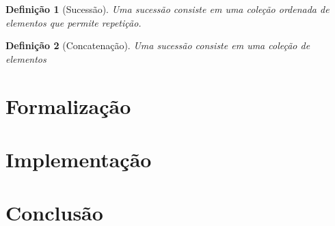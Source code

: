 \documentclass{report}
\newtheorem{definition}{Definição}
\begin{document}

    \begin{definition}[Sucessão]
        Uma sucessão consiste em uma coleção ordenada de elementos que permite repetição.
    \end{definition}

    \begin{definition}[Concatenação]
        Uma sucessão consiste em uma coleção de elementos 
    \end{definition}

    \chapter{Formalização}
    \chapter{Implementação}
    \chapter{Conclusão}

    
    
\end{document}
